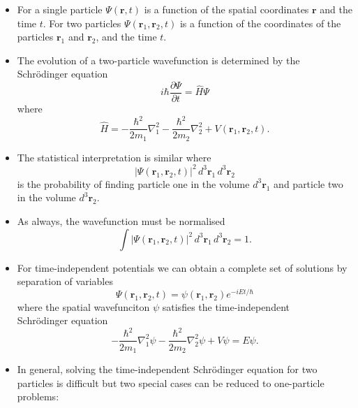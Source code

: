 \documentclass{article}
\renewcommand{\vec}[1]{\boldsymbol{\mathbf{#1}}}
\begin{document}
\begin{itemize}
  \item For a single particle $\Psi(\vec{r}, t)$ is a function of the spatial coordinates $\vec{r}$ and the time $t$. For two particles $\Psi(\vec{r}_1, \vec{r}_2, t)$ is a function of the coordinates of the particles $\vec{r}_1$ and $\vec{r}_2$, and the time $t$.

  \item The evolution of a two-particle wavefunction is determined by the \\ Schrödinger equation \[i \hbar \frac{\partial \Psi}{\partial t} = \hat{H} \Psi\] where \[\hat{H} = -\frac{\hbar^2}{2 m_1} \nabla_1^2 - \frac{\hbar^2}{2 m_2} \nabla_2^2 + V(\vec{r}_1, \vec{r}_2, t).\]

  \item The statistical interpretation is similar where \[|\Psi(\vec{r}_1, \vec{r}_2, t)|^2 \,d^3 \vec{r}_1 \,d^3 \vec{r}_2\] is the probability of finding particle one in the volume $d^3 \vec{r}_1$ and particle two in the volume $d^3 \vec{r}_2$.

  \item As always, the wavefunction must be normalised \[\int |\Psi(\vec{r}_1, \vec{r}_2, t)|^2 \,d^3 \vec{r}_1 \,d^3 \vec{r}_2 = 1.\]

  \item For time-independent potentials we can obtain a complete set of solutions by separation of variables \[\Psi(\vec{r}_1, \vec{r}_2, t) = \psi(\vec{r}_1, \vec{r}_2) e^{-i E t / \hbar}\] where the spatial wavefunciton $\psi$ satisfies the time-independent \\ Schrödinger equation \[-\frac{\hbar^2}{2 m_1} \nabla_1^2 \psi - \frac{\hbar^2}{2 m_2} \nabla_2^2 \psi + V \psi = E \psi.\]

  \item In general, solving the time-independent Schrödinger equation for two particles is difficult but two special cases can be reduced to one-particle problems:


\end{itemize}
\end{document}
